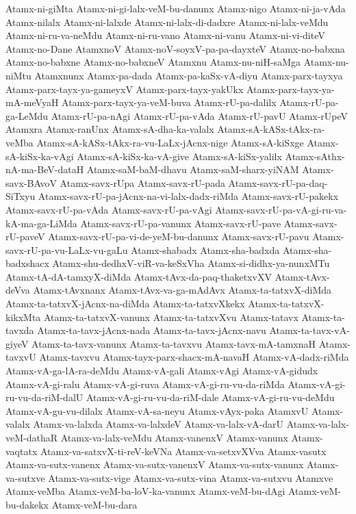 {Atamx-ni-giMta
Atamx-ni-gi-lalx-veM-bu-danunx
Atamx-nigo
Atamx-ni-ja-vAda
Atamx-nilalx
Atamx-ni-lalxde
Atamx-ni-lalx-di-dadxre
Atamx-ni-lalx-veMdu
Atamx-ni-ru-va-neMdu
Atamx-ni-ru-vano
Atamx-ni-vanu
Atamx-ni-vi-diteV
Atamx-no-Dane
AtamxnoV
Atamx-noV-soyxV-pa-pa-dayxteV
Atamx-no-babxna
Atamx-no-babxne
Atamx-no-babxneV
Atamxnu
Atamx-nu-niH-saMga
Atamx-nu-niMtu
Atamxnunx
Atamx-pa-dada
Atamx-pa-kaSx-vA-diyu
Atamx-parx-tayxya
Atamx-parx-tayx-ya-gameyxV
Atamx-parx-tayx-yakUkx
Atamx-parx-tayx-ya-mA-meVyaH
Atamx-parx-tayx-ya-veM-buva
Atamx-rU-pa-dalilx
Atamx-rU-pa-ga-LeMdu
Atamx-rU-pa-nAgi
Atamx-rU-pa-vAda
Atamx-rU-pavU
Atamx-rUpeV
Atamxra
Atamx-ranUnx
Atamx-sA-dha-ka-valalx
Atamx-sA-kASx-tAkx-ra-veMba
Atamx-sA-kASx-tAkx-ra-vu-LaLx-jAcnx-nige
Atamx-sA-kiSxge
Atamx-sA-kiSx-ka-vAgi
Atamx-sA-kiSx-ka-vA-give
Atamx-sA-kiSx-yalilx
Atamx-sAthx-nA-ma-BeV-dataH
Atamx-saM-baM-dhavu
Atamx-saM-sharx-yiNAM
Atamx-savx-BAvoV
Atamx-savx-rUpa
Atamx-savx-rU-pada
Atamx-savx-rU-pa-daq-SiTxyu
Atamx-savx-rU-pa-jAcnx-na-vi-lalx-dadx-riMda
Atamx-savx-rU-pakekx
Atamx-savx-rU-pa-vAda
Atamx-savx-rU-pa-vAgi
Atamx-savx-rU-pa-vA-gi-ru-va-kA-ma-ga-LiMda
Atamx-savx-rU-pa-vanunx
Atamx-savx-rU-pave
Atamx-savx-rU-paveV
Atamx-savx-rU-pa-vi-de-yeM-bu-danunx
Atamx-savx-rU-pavu
Atamx-savx-rU-pa-vu-LaLx-vu-gaLu
Atamx-shabadx
Atamx-sha-badxda
Atamx-sha-badxshacx
Atamx-shu-dedhxV-viR-va-keSxVha
Atamx-si-didhx-ya-nunxMTu
Atamx-tA-dA-tamxyX-diMda
Atamx-tAvx-da-paq-thaketxvXV
Atamx-tAvx-deVva
Atamx-tAvxnanx
Atamx-tAvx-va-ga-mAdAvx
Atamx-ta-tatxvX-diMda
Atamx-ta-tatxvX-jAcnx-na-diMda
Atamx-ta-tatxvXkekx
Atamx-ta-tatxvX-kikxMta
Atamx-ta-tatxvX-vanunx
Atamx-ta-tatxvXvu
Atamx-tatavx
Atamx-ta-tavxda
Atamx-ta-tavx-jAcnx-nada
Atamx-ta-tavx-jAcnx-navu
Atamx-ta-tavx-vA-giyeV
Atamx-ta-tavx-vanunx
Atamx-ta-tavxvu
Atamx-tavx-mA-tamxnaH
Atamx-tavxvU
Atamx-tavxvu
Atamx-tayx-parx-shacx-mA-navaH
Atamx-vA-dadx-riMda
Atamx-vA-ga-lA-ra-deMdu
Atamx-vA-gali
Atamx-vAgi
Atamx-vA-gidudx
Atamx-vA-gi-ralu
Atamx-vA-gi-ruva
Atamx-vA-gi-ru-vu-da-riMda
Atamx-vA-gi-ru-vu-da-riM-dalU
Atamx-vA-gi-ru-vu-da-riM-dale
Atamx-vA-gi-ru-vu-deMdu
Atamx-vA-gu-vu-dilalx
Atamx-vA-sa-neyu
Atamx-vAyx-paka
AtamxvU
Atamx-valalx
Atamx-va-lalxda
Atamx-va-lalxdeV
Atamx-va-lalx-vA-darU
Atamx-va-lalx-veM-dathaR
Atamx-va-lalx-veMdu
Atamx-vanenxV
Atamx-vanunx
Atamx-vaqtatx
Atamx-va-satxvX-ti-reV-keVNa
Atamx-va-setxvXVva
Atamx-vasutx
Atamx-va-sutx-vanenx
Atamx-va-sutx-vanenxV
Atamx-va-sutx-vanunx
Atamx-va-sutxve
Atamx-va-sutx-vige
Atamx-va-sutx-vina
Atamx-va-sutxvu
Atamxve
Atamx-veMba
Atamx-veM-ba-loV-ka-vanunx
Atamx-veM-bu-dAgi
Atamx-veM-bu-dakekx
Atamx-veM-bu-dara
}
